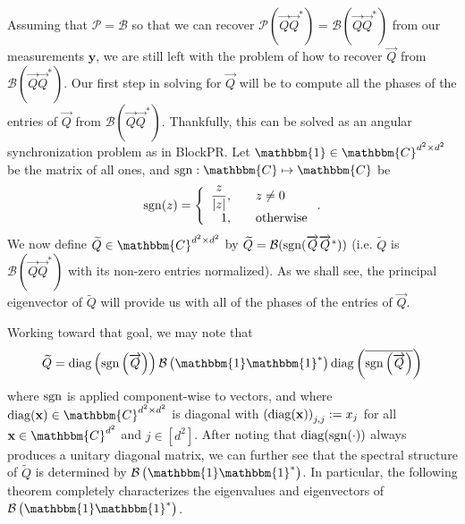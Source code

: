 \documentclass[]{spie}  %
\def \vec{\overrightarrow}
\def \x {\mathbf x}
\def \y {\mathbf y}
\def \P {\mathcal{P}}
\def \B {\mathcal{B}}
\def \one { \mathbbm{1}}
\def \sgn {{\rm sgn}}
\def \diag {{\rm diag}}
\begin{document}
Assuming that $\P = \B$ so that we can recover $\P ( \vec{Q} \vec{Q}^* ) = \B ( \vec{Q} \vec{Q}^* )$ from our measurements $\y$, we are still left with the problem of how to recover $\vec{Q}$ from $\B ( \vec{Q} \vec{Q}^* )$.  Our first step in solving for $\vec{Q}$ will be to compute all the phases of the entries of $\vec{Q}$ from $\B(\vec{Q} \vec{Q}^*)$.  Thankfully, this can be solved as an angular synchronization problem\cite{singer2011angular} as in BlockPR.\cite{viswanathana2015fast,iwen2016phase}  Let $\one \in \mathbbm{C}^{d^2 \times d^2}$ be the matrix of all ones, and $\sgn: \mathbbm{C} \mapsto  \mathbbm{C}$ be 
$$\sgn(z) = \left\{\begin{array}{r@{,\qquad}l} \dfrac{z}{|z|} & z \neq 0 \\ 1 & \text{otherwise} \end{array}\right..$$
We now define $\widetilde{Q} \in \mathbbm{C}^{d^2 \times d^2}$ by $\widetilde{Q} = \B(\sgn(\vec{Q} \vec{Q}^*))$ (i.e. $\widetilde{Q}$ is $\B(\vec{Q}\vec{Q}^*)$ with its non-zero entries normalized). %
As we shall see, the principal eigenvector of $\widetilde{Q}$ will provide us with all of the phases of the entries of $\vec{Q}$.

Working toward that goal, we may note that
\begin{equation}
\widetilde{Q} = \diag \left( \sgn \left( \vec{Q} \right) \right) \B \left( \one \one^* \right) \diag \left( \overline{\sgn \left( \vec{Q} \right)} \right)
\label{equ:Qtilde_partial_factor}
\end{equation}
where $\sgn$ is applied component-wise to vectors, and where $\diag(\x)  \in \mathbbm{C}^{d^2 \times d^2}$ is diagonal with $\left(\diag(\x)\right)_{j,j} := x_j$ for all $\x \in \mathbbm{C}^{d^2}$ and $j \in [d^2]$.  After noting that $\diag(\sgn(\cdot))$ always produces a unitary diagonal matrix, we can further see that the spectral structure of $\widetilde{Q}$ is determined by $\B \left( \one \one^* \right)$.  In particular, the following theorem completely characterizes the eigenvalues and eigenvectors of $\B \left( \one \one^* \right)$.
\end{document}
